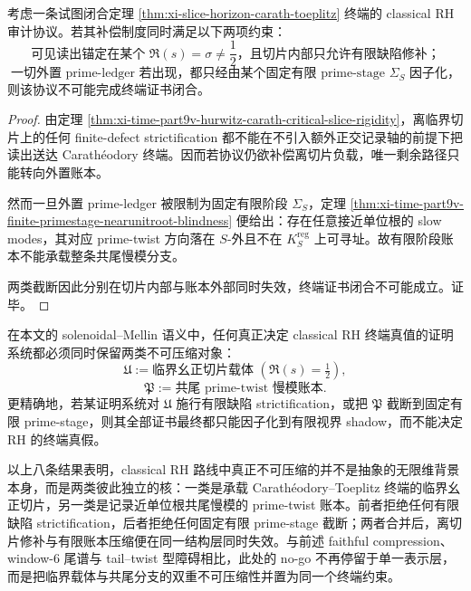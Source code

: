 \begin{corollary}\label{cor:xi-time-part9v-dual-truncation-no-go}
考虑一条试图闭合定理 \ref{thm:xi-slice-horizon-carath-toeplitz} 终端的 classical RH 审计协议。若其补偿制度同时满足以下两项约束：
\[
\text{可见读出锚定在某个 }\Re(s)=\sigma\neq\frac12\text{，且切片内部只允许有限缺陷修补；}
\]
\[
\text{一切外置 prime-ledger 若出现，都只经由某个固定有限 prime-stage }\Sigma_S\text{ 因子化，}
\]
则该协议不可能完成终端证书闭合。
\end{corollary}
\begin{proof}
由定理 \ref{thm:xi-time-part9v-hurwitz-carath-critical-slice-rigidity}，离临界切片上的任何 finite-defect strictification 都不能在不引入额外正交记录轴的前提下把读出送达 Carath\'eodory 终端。因而若协议仍欲补偿离切片负载，唯一剩余路径只能转向外置账本。

然而一旦外置 prime-ledger 被限制为固定有限阶段 \(\Sigma_S\)，定理 \ref{thm:xi-time-part9v-finite-primestage-nearunitroot-blindness} 便给出：存在任意接近单位根的 slow modes，其对应 prime-twist 方向落在 \(S\)-外且不在 \(K_S^{\mathrm{reg}}\) 上可寻址。故有限阶段账本不能承载整条共尾慢模分支。

两类截断因此分别在切片内部与账本外部同时失效，终端证书闭合不可能成立。证毕。
\end{proof}

\begin{conjecture}\label{conj:xi-time-part9v-rh-double-incompressible-core}
在本文的 solenoidal--Mellin 语义中，任何真正决定 classical RH 终端真值的证明系统都必须同时保留两类不可压缩对象：
\[
\mathfrak U:=\text{临界幺正切片载体 }(\Re(s)=\tfrac12),
\]
\[
\mathfrak P:=\text{共尾 prime-twist 慢模账本}.
\]
更精确地，若某证明系统对 \(\mathfrak U\) 施行有限缺陷 strictification，或把 \(\mathfrak P\) 截断到固定有限 prime-stage，则其全部证书最终都只能因子化到有限视界 shadow，而不能决定 RH 的终端真假。
\end{conjecture}

\noindent
以上八条结果表明，classical RH 路线中真正不可压缩的并不是抽象的无限维背景本身，而是两类彼此独立的核：一类是承载 Carath\'eodory--Toeplitz 终端的临界幺正切片，另一类是记录近单位根共尾慢模的 prime-twist 账本。前者拒绝任何有限缺陷 strictification，后者拒绝任何固定有限 prime-stage 截断；两者合并后，离切片修补与有限账本压缩便在同一结构层同时失效。与前述 faithful compression、window-\(6\) 尾谱与 tail--twist 型障碍相比，此处的 no-go 不再停留于单一表示层，而是把临界载体与共尾分支的双重不可压缩性并置为同一个终端约束。

\endinput
